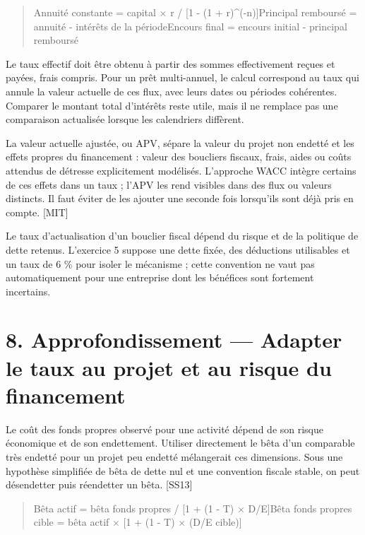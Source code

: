 \documentclass[12pt,a4paper]{article}
\begin{document}
\begin{quote}\small Annuité constante = capital $\times$ r / [1 - (1 + r)\textasciicircum{}(-n)]\newline Principal remboursé = annuité - intérêts de la période\newline Encours final = encours initial - principal remboursé\end{quote}

Le taux effectif doit être obtenu à partir des sommes effectivement reçues et payées, frais compris. Pour un prêt multi-annuel, le calcul correspond au taux qui annule la valeur actuelle de ces flux, avec leurs dates ou périodes cohérentes. Comparer le montant total d’intérêts reste utile, mais il ne remplace pas une comparaison actualisée lorsque les calendriers diffèrent.


La valeur actuelle ajustée, ou APV, sépare la valeur du projet non endetté et les effets propres du financement : valeur des boucliers fiscaux, frais, aides ou coûts attendus de détresse explicitement modélisés. L’approche WACC intègre certains de ces effets dans un taux ; l’APV les rend visibles dans des flux ou valeurs distincts. Il faut éviter de les ajouter une seconde fois lorsqu’ils sont déjà pris en compte. [MIT]


Le taux d’actualisation d’un bouclier fiscal dépend du risque et de la politique de dette retenus. L’exercice 5 suppose une dette fixée, des déductions utilisables et un taux de 6 \% pour isoler le mécanisme ; cette convention ne vaut pas automatiquement pour une entreprise dont les bénéfices sont fortement incertains.

\section*{8. Approfondissement --- Adapter le taux au projet et au risque du financement}
Le coût des fonds propres observé pour une activité dépend de son risque économique et de son endettement. Utiliser directement le bêta d’un comparable très endetté pour un projet peu endetté mélangerait ces dimensions. Sous une hypothèse simplifiée de bêta de dette nul et une convention fiscale stable, on peut désendetter puis réendetter un bêta. [SS13]



\begin{quote}\small Bêta actif = bêta fonds propres / [1 + (1 - T) $\times$ D/E]\newline Bêta fonds propres cible = bêta actif $\times$ [1 + (1 - T) $\times$ (D/E cible)]\end{quote}
\end{document}
